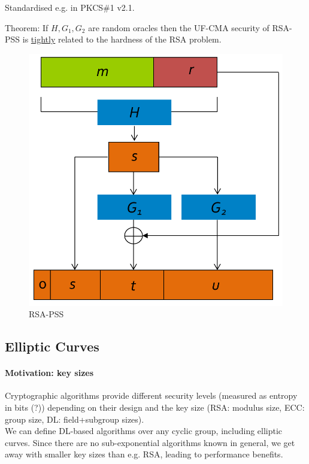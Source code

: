 Standardised e.g. in PKCS\#1 v2.1.

Theorem:
If $H, G_1, G_2$ are random oracles then the UF-CMA security of RSA-PSS is
\underline{tightly} related to the hardness of the RSA problem.

\begin{figure}[h]
    \centering
	\includegraphics[scale=0.3]{images/rsa-pss.png}
    \caption{RSA-PSS}
    \label{fig:rsa-pss}
\end{figure}


\subsection{Elliptic Curves}

\paragraph{Motivation: key sizes}
Cryptographic algorithms provide different security levels (measured as entropy in bits (?))
depending on their design and the key size (RSA: modulus size, ECC: group size, DL: field+subgroup sizes).
\\
We can define DL-based algorithms over any cyclic group, including elliptic curves.
Since there are no sub-exponential algorithms known in general,
we get away with smaller key sizes than e.g. RSA, leading to performance benefits.


